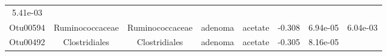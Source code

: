 \documentclass[11pt,]{article}
\begin{document}
\begin{longtable}[]{@{}cccccccc@{}}
\begin{minipage}[t]{0.08\columnwidth}
5.41e-03\strut
\end{minipage}\tabularnewline
\begin{minipage}[t]{0.08\columnwidth}\centering\strut
Otu00594\strut
\end{minipage} & \begin{minipage}[t]{0.15\columnwidth}\centering\strut
Ruminococcaceae\strut
\end{minipage} & \begin{minipage}[t]{0.15\columnwidth}\centering\strut
Ruminococcaceae\strut
\end{minipage} & \begin{minipage}[t]{0.08\columnwidth}\centering\strut
adenoma\strut
\end{minipage} & \begin{minipage}[t]{0.09\columnwidth}\centering\strut
acetate\strut
\end{minipage} & \begin{minipage}[t]{0.07\columnwidth}\centering\strut
-0.308\strut
\end{minipage} & \begin{minipage}[t]{0.08\columnwidth}\centering\strut
6.94e-05\strut
\end{minipage} & \begin{minipage}[t]{0.08\columnwidth}\centering\strut
6.04e-03\strut
\end{minipage}\tabularnewline
\begin{minipage}[t]{0.08\columnwidth}\centering\strut
Otu00492\strut
\end{minipage} & \begin{minipage}[t]{0.15\columnwidth}\centering\strut
Clostridiales\strut
\end{minipage} & \begin{minipage}[t]{0.15\columnwidth}\centering\strut
Clostridiales\strut
\end{minipage} & \begin{minipage}[t]{0.08\columnwidth}\centering\strut
adenoma\strut
\end{minipage} & \begin{minipage}[t]{0.09\columnwidth}\centering\strut
acetate\strut
\end{minipage} & \begin{minipage}[t]{0.07\columnwidth}\centering\strut
-0.305\strut
\end{minipage} & \begin{minipage}[t]{0.08\columnwidth}\centering\strut
8.16e-05\strut
\end{minipage} & \begin{minipage}[t]{0.08\columnwidth}\centering\strut

\end{minipage}
\end{longtable}
\end{document}
